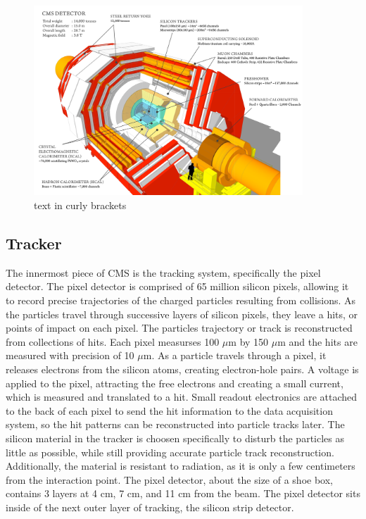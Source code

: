 \begin{figure}[hbtp]
 \begin{center}
   \includegraphics[width=0.9\textwidth]{cms_overview.pdf}
   \caption[text in square brackets]{text in curly brackets}
   \label{fig:cms_overview}
 \end{center}
\end{figure}

\subsection{Tracker}
The innermost piece of CMS is the tracking system, specifically the pixel detector. The pixel detector is comprised of 65 million silicon pixels, allowing it to record
precise trajectories of the charged particles resulting from collisions. As the particles travel through successive layers of silicon pixels, they leave a hits, or points
of impact on each pixel. The particles trajectory or track is reconstructed from collections of hits. Each pixel measurses 100 $\mu$m by 150 $\mu$m and
the hits are measured with precision of 10 $\mu$m. As a particle travels through a pixel, it releases electrons from the silicon atoms, creating electron-hole pairs.
A voltage is applied to the pixel, attracting the free electrons and creating a small current, which is measured and translated to a hit. Small readout electronics
are attached to the back of each pixel to send the hit information to the data acquisition system, so the hit patterns can be reconstructed into particle tracks later.   
The silicon material in the tracker is choosen specifically to disturb the particles as little as possible, while still providing accurate particle track reconstruction.
Additionally, the material is resistant to radiation, as it is only a few centimeters from the interaction point. The pixel detector, about the size of a shoe box, contains
3 layers at 4 cm, 7 cm, and 11 cm from the beam. The pixel detector sits inside of the next outer layer of tracking, the silicon strip detector.  

